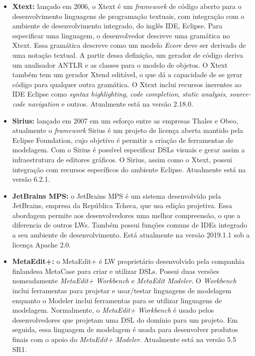 \begin{itemize}
    \item \textbf{Xtext:} lançado em 2006, o Xtext é um \textit{framework} de código aberto para o desenvolvimento linguagens de programação textuais, com integração com o ambiente de desenvolvimento integrado, do inglês \ac{IDE}, Eclipse. 
    Para especificar uma linguagem, o desenvolvedor descreve uma gramática no Xtext. 
    Essa gramática descreve como um modelo \textit{Ecore} deve ser derivado de uma notação textual. 
    A partir dessa definição, um gerador de código deriva um analisador ANTLR e as classes para o modelo de objetos. 
    O Xtext também tem um gerador Xtend editável, o que dá a capacidade de se gerar código para qualquer outra gramática. 
    O Xtext inclui recursos inerentes ao \ac{IDE} Eclipse como \textit{syntax highlighting}, \textit{code completion}, \textit{static analysis}, \textit{source-code navigation} e outros. 
    Atualmente está na versão 2.18.0.
    
    \item \textbf{Sirius:} lançado em 2007 em um esforço entre as empresas Thales e Obeo, atualmente o \textit{framework} Sirius é um projeto de licença aberta mantido pela Eclipse Foundation, cujo objetivo é permitir a criação de ferramentas de modelagem. 
    Com o Sirius é possível especificar \acp{DSL} visuais e gerar assim a infraestrutura de editores gráficos.
    O Sirius, assim como o Xtext, possui integração com recursos específicos do ambiente Eclipse. Atualmente está na versão 6.2.1.
    
    \item \textbf{JetBrains MPS:} o JetBrains MPS é um sistema desenvolvido pela JetBrains, empresa da República Tcheca, que usa edição projetiva. 
    Essa abordagem permite aos desenvolvedores uma melhor compreensão, o que a diferencia de outros \acp{LW}. 
    Também possui funções comuns de \acp{IDE} integrado a seu ambiente de desenvolvimento. 
    Está atualmente na versão 2019.1.1 sob a licença Apache 2.0.
    
    \item \textbf{MetaEdit+:} o MetaEdit+ é \ac{LW} proprietário desenvolvido pela companhia finlandesa MetaCase para criar e utilizar \acp{DSL}. 
    Possui duas versões nomeadamente \textit{MetaEdit+ Workbench} e \textit{MetaEdit Modeler}. 
    O \textit{Workbench} inclui ferramentas para projetar e usar/testar linguagens de modelagem enquanto o Modeler inclui ferramentas para se utilizar linguagens de modelagem. 
    Normalmente, o \textit{MetaEdit+ Workbench} é usado pelos desenvolvedores que projetam uma \ac{DSL} do domínio para um projeto. 
    Em seguida, essa linguagem de modelagem é usada para desenvolver produtos finais com o apoio do \textit{MetaEdit+ Modeler}. 
    Atualmente está na versão 5.5 SR1.
\end{itemize}

